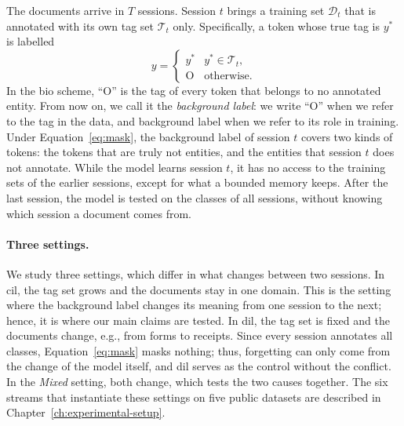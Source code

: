 The documents arrive in $T$ sessions. Session $t$ brings a training set $\mathcal{D}_t$ that
is annotated with its own tag set $\mathcal{T}_t$ only. Specifically, a token whose true tag
is $y^{\ast}$ is labelled
\begin{equation}
  y=\begin{cases} y^{\ast} & y^{\ast}\in\mathcal{T}_t,\\ \mathrm{O} & \text{otherwise.}\end{cases}
  \label{eq:mask}
\end{equation}
In the \gls{bio} scheme, ``O'' is the tag of every token that belongs to no annotated entity.
From now on, we call it the \emph{background label}: we write ``O'' when we refer to the tag in
the data, and background label when we refer to its role in training. Under
Equation~\eqref{eq:mask}, the background label of session $t$ covers two kinds of tokens: the
tokens that are truly not entities, and the entities that session $t$ does not annotate. While
the model learns session $t$, it has no access to the training sets of the earlier sessions,
except for what a bounded memory keeps. After the last session, the model is tested on the
classes of all sessions, without knowing which session a document comes from.

\paragraph{Three settings.} We study three settings, which differ in what changes between
two sessions. In \gls{cil}, the tag set grows and the documents stay in one domain. This is
the setting where the background label changes its meaning from one session to the next;
hence, it is where our main claims are tested. In \gls{dil}, the tag set is fixed and the
documents change, e.g., from forms to receipts. Since every session annotates all classes,
Equation~\eqref{eq:mask} masks nothing; thus, forgetting can only come from the change of the
model itself, and \gls{dil} serves as the control without the conflict. In the \emph{Mixed}
setting, both change, which tests the two causes together. The six streams that instantiate
these settings on five public datasets are described in Chapter~\ref{ch:experimental-setup}.

